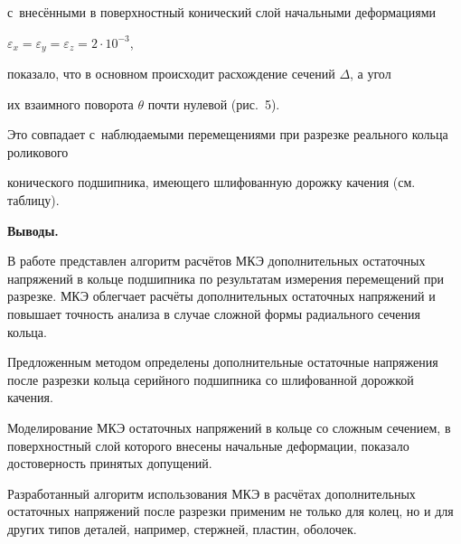 с~внесёнными в поверхностный конический слой начальными деформациями

$\varepsilon _x =\varepsilon _y =\varepsilon _z =2\cdot 10^{-3}$,

показало, что в основном происходит расхождение сечений $\Delta $, а угол

их взаимного поворота $\theta $ почти нулевой (рис.~5).

Это совпадает с~наблюдаемыми перемещениями при разрезке реального кольца роликового

конического подшипника, имеющего шлифованную дорожку качения (см. таблицу).



{\bf Выводы.}

В работе представлен алгоритм расчётов МКЭ дополнительных остаточных напряжений в кольце подшипника по результатам измерения перемещений при разрезке. МКЭ облегчает расчёты дополнительных остаточных напряжений и повышает точность анализа в случае сложной формы радиального сечения кольца.



Предложенным методом определены дополнительные остаточные напряжения после разрезки кольца серийного подшипника со шлифованной дорожкой качения.



Моделирование МКЭ остаточных напряжений в кольце со сложным сечением, в поверхностный слой которого внесены начальные деформации, показало достоверность принятых допущений.



Разработанный алгоритм использования МКЭ в расчётах дополнительных остаточных напряжений после разрезки применим не только для колец, но и для других типов деталей, например, стержней, пластин, оболочек.





